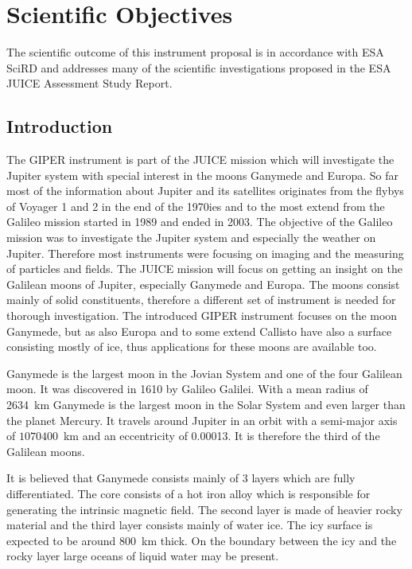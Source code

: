 \section{Scientific Objectives}
%
The scientific outcome of this instrument proposal is in accordance
with ESA \ac{SciRD}\cite{yellowbook} and addresses many of the scientific
investigations proposed in the ESA JUICE Assessment Study Report\cite{yellowbook}.
%
%
\subsection{Introduction \label{sub:Introduction-science}}
%
The GIPER instrument is part of the JUICE mission which will investigate
the Jupiter system with special interest in the moons Ganymede and
Europa. So far most of the information about Jupiter and its satellites
originates from the flybys of Voyager 1 and 2 in the end of the 1970ies
and to the most extend from the Galileo mission started in 1989 and
ended in 2003. The objective of the Galileo mission was to investigate
the Jupiter system and especially the weather on Jupiter. Therefore
most instruments were focusing on imaging and the measuring of particles
and fields. The JUICE mission will focus on getting an insight on
the Galilean moons of Jupiter, especially Ganymede and Europa. The
moons consist mainly of solid constituents, therefore a different
set of instrument is needed for thorough investigation. The introduced
GIPER instrument focuses on the moon Ganymede, but as also Europa
and to some extend Callisto have also a surface consisting mostly
of ice, thus applications for these moons are available too.

Ganymede is the largest moon in the Jovian System and one of the four
Galilean moon. It was discovered in 1610 by Galileo Galilei. With
a mean radius of 2634~km Ganymede is the largest moon in the Solar
System and even larger than the planet Mercury. It travels around
Jupiter in an orbit with a semi-major axis of $1070400$~km and an
eccentricity of 0.00013. It is therefore the third of the Galilean
moons\cite{pater2010planetary}. 

It is believed that Ganymede consists mainly of 3 layers which are
fully differentiated. The core consists of a hot iron alloy which
is responsible for generating the intrinsic magnetic field. The second
layer is made of heavier rocky material and the third layer consists
mainly of water ice. The icy surface is expected to be around 800~km
thick. On the boundary between the icy and the rocky layer large oceans
of liquid water may be present\cite{bagenal2007jupiter}.


